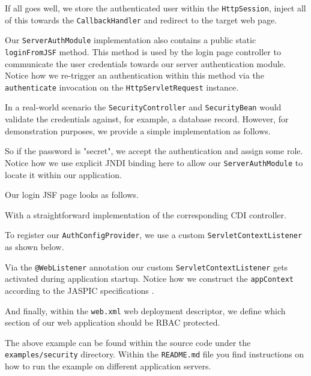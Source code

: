 If all goes well, we store the authenticated user within the \texttt{HttpSession},
inject all of this towards the \texttt{CallbackHandler} and redirect to the target web page.

Our \texttt{ServerAuthModule} implementation also contains a public static \texttt{loginFromJSF} method.
This method is used by the login page controller to communicate the user credentials towards our server authentication module.
Notice how we re-trigger an authentication within this method via the \texttt{authenticate} invocation on the \texttt{HttpServletRequest} instance.

In a real-world scenario the \texttt{SecurityController} and \texttt{SecurityBean} would validate the credentials against, for example, a database record.
However, for demonstration purposes, we provide a simple implementation as follows.


So if the password is "secret", we accept the authentication and assign some role.
Notice how we use explicit JNDI binding here to allow our \texttt{ServerAuthModule} to locate it within our application.

Our login JSF page looks as follows.

With a straightforward implementation of the corresponding CDI controller. 


To register our \texttt{AuthConfigProvider},
we use a custom \texttt{ServletContextListener} as shown below.

Via the \texttt{@WebListener} annotation our custom \texttt{ServletContextListener} gets activated during application startup.
Notice how we construct the \texttt{appContext} according to the JASPIC specifications \cite{jaspic}.

And finally, within the \texttt{web.xml} web deployment descriptor,
we define which section of our web application should be RBAC protected.


The above example can be found within the source code under the \texttt{examples/security} directory.
Within the \texttt{README.md} file you find instructions on how to run the example on different application servers.

